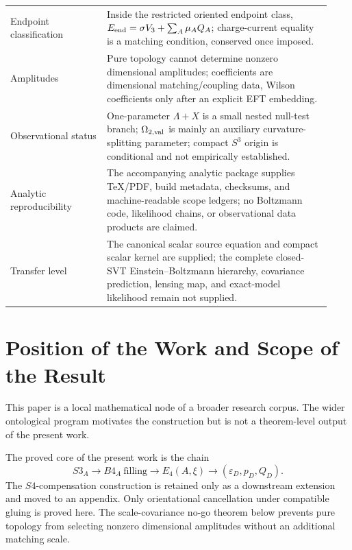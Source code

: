 \documentclass[11pt,a4paper]{article}
\def\Bfour{B4}%
\def\Sthree{S3}%
\def\Sfour{S4}%
\numberwithin{equation}{section}
\theoremstyle{definition}
\theoremstyle{plain}
\theoremstyle{remark}
\newcommand{\Sthree}{S^3}
\newcommand{\Sfour}{S^4}
\newcommand{\Bfour}{B^4}
\newcommand{\Efour}{E_4}
\newcommand{\epsD}{\varepsilon_D}
\newcommand{\pD}{p_D}
\newcommand{\QD}{Q_D}
\begin{document}
\begin{center}
\begin{tabular}{@{}p{0.28\linewidth}p{0.65\linewidth}@{}}
Endpoint classification & Inside the restricted oriented endpoint class, \(E_{\rm end}=\sigma V_3+\sum_A\mu_AQ_A\); charge-current equality is a matching condition, conserved once imposed. \\
Amplitudes & Pure topology cannot determine nonzero dimensional amplitudes; coefficients are dimensional matching/coupling data, Wilson coefficients only after an explicit EFT embedding. \\
Observational status & One-parameter \(\Lambda+X\) is a small nested null-test branch; \(\Omega_{2,\rm val}\) is mainly an auxiliary curvature-splitting parameter; compact \(S^3\) origin is conditional and not empirically established. \\
Analytic reproducibility & The accompanying analytic package supplies TeX/PDF, build metadata, checksums, and machine-readable scope ledgers; no Boltzmann code, likelihood chains, or observational data products are claimed. \\
Transfer level & The canonical scalar source equation and compact scalar kernel are supplied; the complete closed-SVT Einstein--Boltzmann hierarchy, covariance prediction, lensing map, and exact-model likelihood remain not supplied. \\
\bottomrule
\end{tabular}
\end{center}

\tableofcontents

\section{Position of the Work and Scope of the Result}
This paper is a local mathematical node of a broader research corpus. The wider ontological program motivates the construction but is not a theorem-level output of the present work.

The proved core of the present work is the chain
\begin{equation}
\Sthree_A\longrightarrow \Bfour_A\ \text{filling}\longrightarrow \Efour(A,\xi)\longrightarrow (\epsD,\pD,\QD).
\end{equation}
The \(\Sfour\)-compensation construction is retained only as a downstream extension and moved to an appendix. Only orientational cancellation under compatible gluing is proved here. The scale-covariance no-go theorem below prevents pure topology from selecting nonzero dimensional amplitudes without an additional matching scale.
\end{document}
